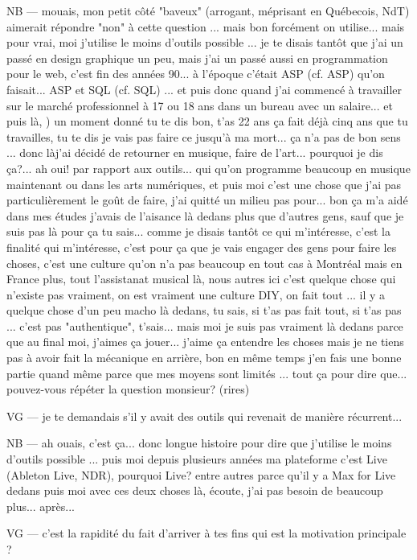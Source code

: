 NB — mouais, mon petit côté "baveux" (arrogant, méprisant en Québecois, NdT) aimerait répondre "non" à cette question ... mais bon forcément on utilise... mais pour vrai, moi j'utilise le moins d'outils possible ... je te disais tantôt que j'ai un passé en design graphique un peu, mais j'ai un passé aussi en programmation pour le web, c'est fin des années 90... à l'époque c'était ASP (cf. \gls{ASP}) qu'on faisait... ASP et SQL (cf. \gls{SQL}) ... et puis donc quand j'ai commencé à travailler sur le marché professionnel à 17 ou 18 ans dans un bureau avec un salaire... et puis là, ) un moment donné tu te dis bon, t'as 22 ans ça fait déjà cinq ans que tu travailles, tu te dis je vais pas faire ce jusqu'à ma mort... ça n'a pas de bon sens ... donc làj'ai décidé de retourner en musique, faire de l'art... pourquoi je dis ça?... ah oui! par rapport aux outils... qui qu'on programme beaucoup en musique maintenant ou dans les arts numériques, et puis moi c'est une chose que j'ai pas particulièrement le goût de faire, j'ai quitté un milieu pas pour... bon ça m'a aidé dans mes études j'avais de l'aisance là dedans plus que d'autres gens, sauf que je suis pas là pour ça tu sais... comme je disais tantôt ce qui m'intéresse, c'est la finalité qui m'intéresse, c'est pour ça que je vais engager des gens pour faire les choses, c'est une culture qu'on n'a pas beaucoup en tout cas à Montréal mais en France plus, tout l'assistanat musical là, nous autres ici c'est quelque chose qui n'existe pas vraiment, on est vraiment une culture \gls{DIY}, on fait tout ... il y a quelque chose d'un peu macho là dedans, tu sais, si t'as pas fait tout, si t'as pas ...  c'est pas "authentique", t'sais... mais moi je suis pas vraiment là dedans parce que au final moi, j'aimes ça jouer... j'aime ça entendre les choses mais je ne tiens pas à avoir fait la mécanique en arrière, bon en même temps j'en fais une bonne partie quand même parce que mes moyens sont limités ... tout ça pour dire que... pouvez-vous répéter la question monsieur? (rires)

VG — je te demandais s'il y avait des outils qui revenait de manière récurrent...

NB — ah ouais, c'est ça...  donc longue histoire pour dire que j'utilise le moins d'outils possible ... puis moi depuis plusieurs années ma plateforme c'est Live (Ableton Live, NDR), pourquoi Live? entre autres parce qu'il y a Max for Live dedans puis moi avec ces deux choses là, écoute, j'ai pas besoin de beaucoup plus... après... 

VG — c'est la rapidité du fait d'arriver à tes fins qui est la motivation principale ?

